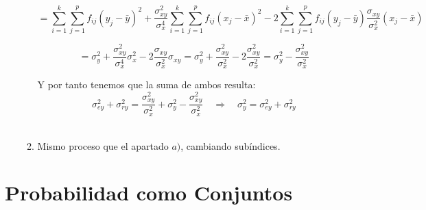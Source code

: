 \documentclass[fleqn]{article}
\def\next{\quad \Rightarrow \quad}
\begin{document}
\begin{enumerate}
\begin{enumerate}
                                        $$
                                        = \sum_{i=1}^k \sum_{j=1}^p f_{ij} (y_j - \bar{y})^2 + \frac{\sigma_{xy}^2}{\sigma_x^4} \sum_{i=1}^k \sum_{j=1}^p f_{ij}(x_j - \bar{x})^2
                                        - 2\sum_{i=1}^k \sum_{j=1}^p f_{ij} (y_j - \bar{y})\frac{\sigma_{xy}}{\sigma_x^2}(x_j - \bar{x})
                                        $$

                                        $$
                                        = \sigma_y^2 + \frac{\sigma_{xy}^2}{\sigma_x^4} \sigma_x^2 - 2\frac{\sigma_{xy}}{\sigma_x^2}\sigma_{xy} = 
                                        \sigma_y^2 + \frac{\sigma_{xy}^2}{\sigma_x^2} -2\frac{\sigma_{xy}^2}{\sigma_x^2} = \sigma_y^2 - \frac{\sigma_{xy}^2}{\sigma_x^2}
                                        $$

                                        Y por tanto tenemos que la suma de ambos resulta:
                                        $$
                                        \sigma^2_{ey} + \sigma^2_{ry} = \frac{\sigma_{xy}^2}{\sigma_x^2} + \sigma_y^2 - \frac{\sigma_{xy}^2}{\sigma_x^2} \next \sigma_y^2 = \sigma^2_{ey} + \sigma^2_{ry}
                                        $$\\
                                \item Mismo proceso que el apartado $a)$, cambiando subíndices.
                        \end{enumerate}

        \end{enumerate}       

        \newpage

        
        \section{Probabilidad como Conjuntos}
\end{document}
